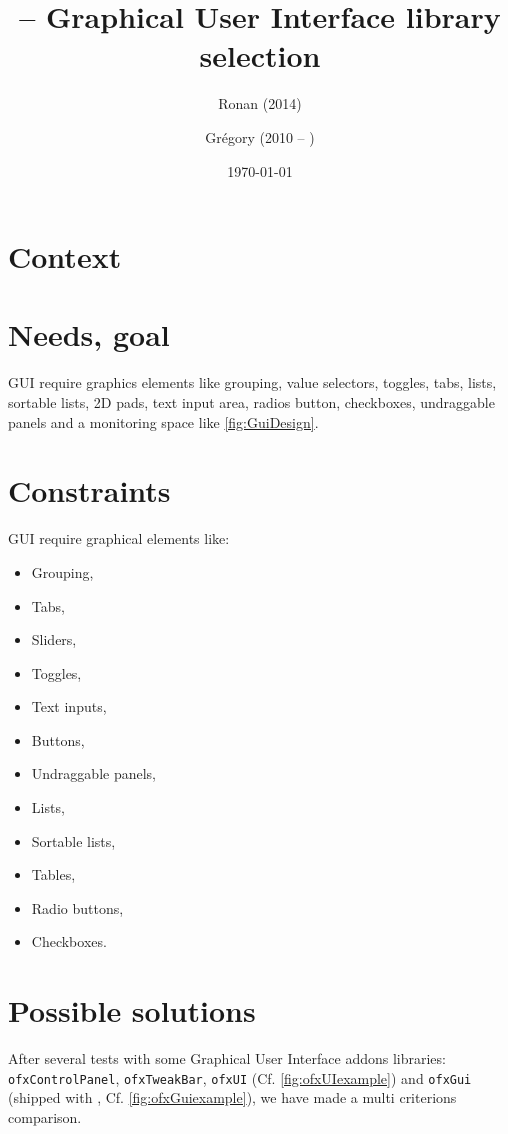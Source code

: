 \documentclass[a4paper,titlepage,oneside]{article}
\author{Ronan \bsc{Legardinier} (2014) \and Grégory \bsc{David} (2010 -- \the\year)}
\title{\vilain{} -- Graphical User Interface library selection}
\date{\today{}}
\begin{document}
\maketitle{}
\tableofcontents{}

\section{Context}


\section{Needs, goal}
\vilain{} GUI require graphics elements like grouping, value
selectors, toggles, tabs, lists, sortable lists, 2D pads, text input
area, radios button, checkboxes, undraggable panels and a monitoring
space like \figurename \ref{fig:GuiDesign}.


\section{Constraints}
\vilain{} GUI require graphical elements like:
\begin{itemize}
    \item Grouping,
    \item Tabs,
    \item Sliders,
    \item Toggles,
    \item Text inputs,
    \item Buttons,
    \item Undraggable panels,
    \item Lists,
    \item Sortable lists,
    \item Tables,
    \item Radio buttons,
    \item Checkboxes.
\end{itemize}

\section{Possible solutions}
After several tests with some \OF{} Graphical User Interface addons
libraries: \texttt{ofxControlPanel}, \texttt{ofxTweakBar},
\texttt{ofxUI} (Cf. \figurename \ref{fig:ofxUIexample}) and
\texttt{ofxGui} (shipped with \OF{}, Cf. \figurename
\ref{fig:ofxGuiexample}), we have made a multi criterions comparison.
\end{document}
